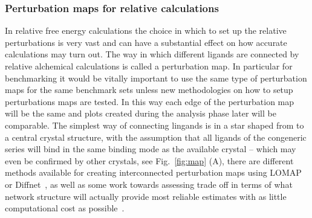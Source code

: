 \documentclass[9pt,bestpractices]{livecoms}
\begin{document}
\subsubsection{Perturbation maps for relative calculations}
In relative free energy calculations the choice in which to set up the relative perturbations is very vast and can have a substantial effect on how accurate calculations may turn out. The way in which different ligands are connected by relative alchemical calculations is called a perturbation map. In particular for benchmarking it would be vitally important to use the same type of perturbation maps for the same benchmark sets unless new methodologies on how to setup perturbations maps are tested. In this way each edge of the perturbation map will be the same and plots created during the analysis phase later will be comparable. The simplest way of connecting lingands is in a star shaped from to a central crystal structure, with the assumption that all ligands of the congeneric series will bind in the same binding mode as the available crystal -- which may even be confirmed by other crystals, see Fig.~\ref{fig:map} (A), there are different methods available for creating interconnected perturbation maps using LOMAP~\cite{} or Diffnet~\cite{}, as well as some work towards assessing trade off in terms of what network structure will actually provide most reliable estimates with as little computational cost as possible~\cite{}.
\end{document}
